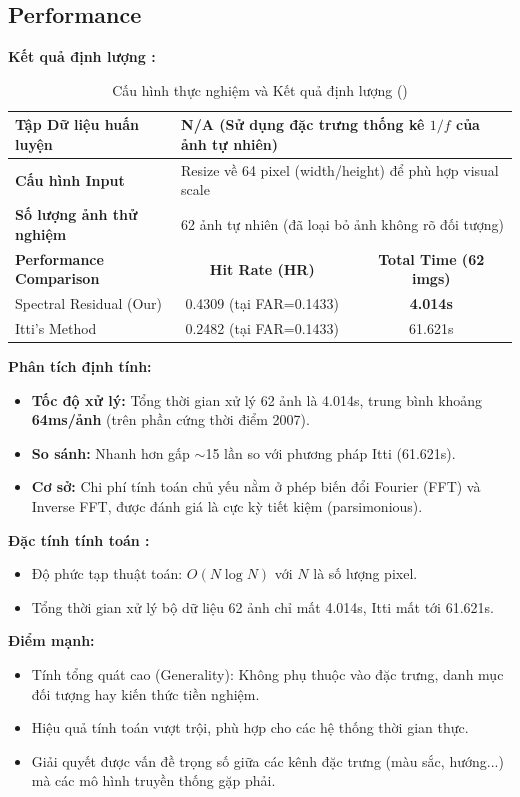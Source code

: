\subsection{Performance}
\textbf{Kết quả định lượng :}
\begin{table}[H]
\centering
\caption{Cấu hình thực nghiệm và Kết quả định lượng (\cite{sr_2007})}
\begin{tabular}{|l|c|c|}
\hline
\textbf{Tập Dữ liệu huấn luyện} & \multicolumn{2}{l|}{N/A (Sử dụng đặc trưng thống kê $1/f$ của ảnh tự nhiên)} \\ \hline
\textbf{Cấu hình Input} & \multicolumn{2}{l|}{Resize về 64 pixel (width/height) để phù hợp visual scale } \\ \hline
\textbf{Số lượng ảnh thử nghiệm} & \multicolumn{2}{l|}{62 ảnh tự nhiên (đã loại bỏ ảnh không rõ đối tượng) } \\ \hline
\hline
\textbf{Performance Comparison} & \textbf{Hit Rate (HR)} & \textbf{Total Time (62 imgs)} \\ \hline
Spectral Residual (Our) & 0.4309 (tại FAR=0.1433) & \textbf{4.014s} \\ \hline
Itti's Method & 0.2482 (tại FAR=0.1433) & 61.621s \\ \hline
\end{tabular}
\end{table}

\textbf{Phân tích định tính:}
\begin{itemize}
    \item \textbf{Tốc độ xử lý:} Tổng thời gian xử lý 62 ảnh là 4.014s, trung bình khoảng \textbf{64ms/ảnh} (trên phần cứng thời điểm 2007).
    \item \textbf{So sánh:} Nhanh hơn gấp $\sim$15 lần so với phương pháp Itti (61.621s).
    \item \textbf{Cơ sở:} Chi phí tính toán chủ yếu nằm ở phép biến đổi Fourier (FFT) và Inverse FFT, được đánh giá là cực kỳ tiết kiệm (parsimonious).
\end{itemize}

\textbf{Đặc tính tính toán :}
\begin{itemize}
    \item Độ phức tạp thuật toán: $O(N \log N)$ với $N$ là số lượng pixel.
    \item Tổng thời gian xử lý bộ dữ liệu 62 ảnh chỉ mất 4.014s,  Itti mất tới 61.621s.
\end{itemize}

\textbf{Điểm mạnh:} 
\begin{itemize}
    \item Tính tổng quát cao (Generality): Không phụ thuộc vào đặc trưng, danh mục đối tượng hay kiến thức tiền nghiệm.
    \item Hiệu quả tính toán vượt trội, phù hợp cho các hệ thống thời gian thực.
    \item Giải quyết được vấn đề trọng số giữa các kênh đặc trưng (màu sắc, hướng...) mà các mô hình truyền thống gặp phải.
\end{itemize}


